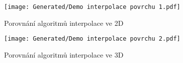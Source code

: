 \begin{imagepage}
    \begin{figure}[H]
        \centering
        \texttt{[image: Generated/Demo interpolace povrchu 1.pdf]}
        \caption{Porovnání algoritmů interpolace ve 2D}
        \label{fig:Demo interpolace povrchu 1}
    \end{figure}
    \begin{figure}[H]
        \centering
        \texttt{[image: Generated/Demo interpolace povrchu 2.pdf]}
        \caption{Porovnání algoritmů interpolace ve 3D}
        \label{fig:Demo interpolace povrchu 2}
    \end{figure}
\end{imagepage}
